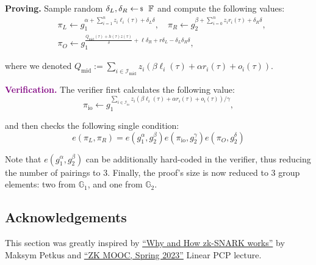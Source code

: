 \documentclass[../lecture-notes-148x210.tex]{subfiles}
\begin{document}
\textcolor{green!50!black}{\textbf{Proving.}} Sample random $\delta_L,\delta_R \leftarrowS \mathbb{F}$ and compute the following values:
\begin{equation*}    
    \begin{aligned}
        &\pi_L \gets g_1^{\alpha + \sum_{i=1}^n z_i\ell_i(\tau) + \delta_L\delta}, \quad \pi_R \gets g_2^{\beta + \sum_{i=0}^n z_ir_i(\tau) + \delta_R\delta}, \\
        &\pi_O \gets g_1^{\frac{Q_{\text{mid}}(\tau)+h(\tau)z(\tau)}{\delta} + \ell\delta_R + r\delta_L - \delta_L\delta_R\delta},
    \end{aligned}
\end{equation*}

where we denoted $Q_{\text{mid}} := \sum_{i \in \mathcal{I}_{\text{mid}}}z_i(\beta \ell_i(\tau) + \alpha r_i(\tau) + o_i(\tau))$.

\textcolor{purple}{\textbf{Verification.}} The verifier first calculates the following value:
\begin{equation*}
    \pi_{\text{io}} \gets g_1^{\sum_{i \in \mathcal{I}_{\text{io}}}z_i(\beta \ell_i(\tau) + \alpha r_i(\tau) + o_i(\tau))/\gamma},
\end{equation*}

and then checks the following single condition:
\begin{equation*}
    e(\pi_L, \pi_R) = e(g_1^{\alpha}, g_2^{\beta})e(\pi_{\text{io}},g_2^{\gamma})e(\pi_O,g_2^{\delta})
\end{equation*}

Note that $e(g_1^{\alpha}, g_2^{\beta})$ can be additionally hard-coded in the verifier, thus reducing the number of pairings to 3. Finally, the proof's size is now reduced to 3 group elements: two from $\mathbb{G}_1$, and one from $\mathbb{G}_2$.

\subsection*{Acknowledgements}

This section was greatly inspired by \cite{petkus2019}
\href{https://arxiv.org/abs/1906.07221}{``Why and How zk-SNARK works''} by
Maksym Petkus and \href{https://rdi.berkeley.edu/zk-learning/}{``ZK MOOC, Spring
2023''} Linear PCP lecture.
\end{document}

